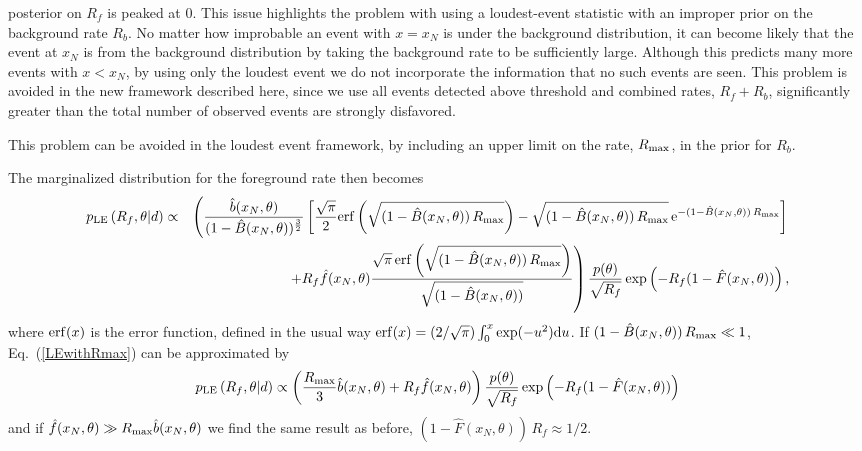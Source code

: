 \documentclass[aps,prd,reprint,nofootinbib]{revtex4-1}
\begin{document}
posterior on $R_f$ is peaked at $0$. This issue highlights the problem
with using a loudest-event statistic with an improper prior on the
background rate $R_b$. No matter how improbable an event with $x=x_N$
is under the background distribution, it can become likely that the
event at $x_N$ is from the background distribution by taking the
background rate to be sufficiently large. Although this predicts many
more events with $x < x_N$, by using only the loudest event we do not
incorporate the information that no such events are seen. This problem
is avoided in the new framework described here, since we use all
events detected above threshold and combined rates, $R_f+R_b$,
significantly greater than the total number of observed events are
strongly disfavored.

This problem can be avoided in the loudest event framework, by
including an upper limit on the rate, $R_{\rm max}$, in the prior for
$R_b$. 
\begin{widetext}
The marginalized distribution for the foreground rate then becomes
\begin{eqnarray}
p_{\rm LE}\left( R_f, \theta | d \right) &\propto& \left(
\frac{\hat{b}(x_N,\theta)}{(1-\hat{B}(x_N,\theta))^{\frac{3}{2}}}
\left[\frac{\sqrt{\pi}}{2}{\rm
    erf}\left(\sqrt{(1-\hat{B}(x_N,\theta))\,R_{\rm max}}\right) -
  \sqrt{(1-\hat{B}(x_N,\theta))\,R_{\rm max}} \, {\rm
    e}^{-(1-\hat{B}(x_N,\theta)) \, R_{\rm max}}\right]
\right. \nonumber \\ && \left.+ R_f
\hat{f}(x_N,\theta)\frac{\sqrt{\pi}\,{\rm
    erf}\left(\sqrt{(1-\hat{B}(x_N,\theta))\,R_{\rm
      max}}\right)}{\sqrt{(1-\hat{B}(x_N,\theta))}}\right)\frac{p(\theta)}{\sqrt{R_f}}
\exp\left(-R_f(1-\hat{F}(x_N,\theta))\right) \label{LEwithRmax},
\end{eqnarray}
where ${\rm erf}(x)$ is the error function, defined in the usual way
${\rm erf}(x) = (2/\sqrt{\pi}) \int_0^x \exp(-u^2){\rm d}u$. If
$(1-\hat{B}(x_N,\theta)) \, R_{\rm max} \ll 1$, Eq.~(\ref{LEwithRmax})
can be approximated by
\begin{equation}
p_{\rm LE}\left( R_f, \theta | d \right) \propto \left( \frac{R_{\rm
    max}}{3} \hat{b}(x_N,\theta) + R_f
\hat{f}(x_N,\theta)\right)\frac{p(\theta)}{\sqrt{R_f}}
\exp\left(-R_f(1-\hat{F}(x_N,\theta))\right)
\end{equation}
and if $\hat{f}(x_N,\theta) \gg R_{\rm max} \hat{b}(x_N,\theta)$ we
find the same result as before, $(1- \hat{F}(x_N,\theta))\,R_f \approx
1/2$.
\end{widetext}
\end{document}
